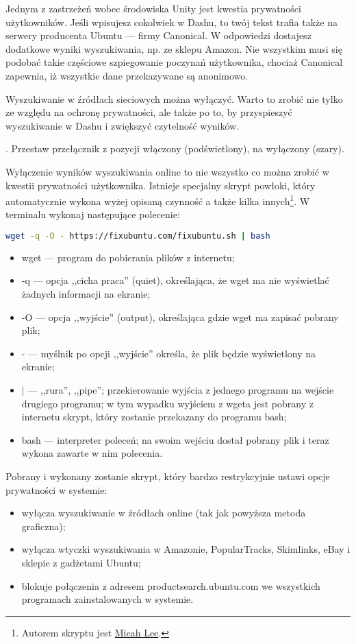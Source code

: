 Jednym z zastrzeżeń wobec środowiska Unity jest kwestia prywatności użytkowników. Jeśli wpisujesz cokolwiek w Dashu, to twój tekst trafia także na serwery producenta Ubuntu --- firmy Canonical. W odpowiedzi dostajesz dodatkowe wyniki wyszukiwania, np. ze sklepu Amazon. Nie wszystkim musi się podobać takie częściowe szpiegowanie poczynań użytkownika, chociaż Canonical zapewnia, iż wszystkie dane przekazywane są anonimowo.

Wyszukiwanie w źródłach sieciowych można wyłączyć. Warto to zrobić nie tylko ze względu na ochronę prywatności, ale także po to, by przyspieszyć wyszukiwanie w Dashu i zwiększyć czytelność wyników.

\noindent {}. Przestaw przełącznik z pozycji włączony (podświetlony), na wyłączony (szary).

Wyłączenie wyników wyszukiwania online to nie wszystko co można zrobić w kwestii prywatności użytkownika. Istnieje specjalny skrypt powłoki, który automatycznie wykona wyżej opisaną czynność a także kilka innych\footnote{Autorem skryptu jest \href{https://micahflee.com/}{Micah Lee}.}. W terminalu wykonaj następujące polecenie:
\begin{lstlisting}[language=bash]
wget -q -O - https://fixubuntu.com/fixubuntu.sh | bash
\end{lstlisting}
\begin{itemize}
\item \textcolor{ubuntu_orange}{wget} --- program do pobierania plików z internetu;
\item \textcolor{ubuntu_orange}{-q} --- opcja ,,cicha praca'' (quiet), określająca, że wget ma nie wyświetlać żadnych informacji na ekranie;
\item \textcolor{ubuntu_orange}{-O} --- opcja ,,wyjście'' (output), określająca gdzie wget ma zapisać pobrany plik;
\item \textcolor{ubuntu_orange}{-} --- myślnik po opcji ,,wyjście'' określa, że plik będzie wyświetlony na ekranie;
\item \textcolor{ubuntu_orange}{$|$} --- ,,rura'', ,,pipe''; przekierowanie wyjścia z jednego programu na wejście drugiego programu; w tym wypadku wyjściem z wgeta jest pobrany z internetu skrypt, który zostanie przekazany do programu bash;
\item \textcolor{ubuntu_orange}{bash} --- interpreter poleceń; na swoim wejściu dostał pobrany plik i teraz wykona zawarte w nim polecenia.
\end{itemize}
Pobrany i wykonany zostanie skrypt, który bardzo restrykcyjnie ustawi opcje prywatności w systemie:
\begin{itemize}
\item wyłącza wyszukiwanie w źródłach online (tak jak powyższa metoda graficzna);
\item wyłącza wtyczki wyszukiwania w Amazonie, PopularTracks, Skimlinks, eBay i sklepie z gadżetami Ubuntu;
\item blokuje połączenia z adresem productsearch.ubuntu.com we wszystkich programach zainstalowanych w systemie.
\end{itemize}